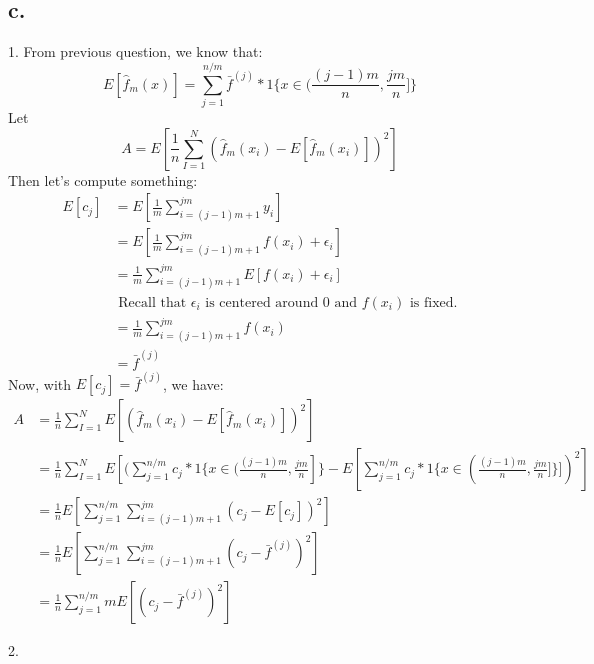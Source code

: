 \documentclass{article}
\begin{document}
\subsection*{c.}

1. \newline
From previous question, we know that:
\[
E[\hat{f}_m(x)] = \sum_{j=1}^{n/m} \bar{f}^{(j)} *1\{x \in (\frac{(j-1)m}{n},\frac{jm}{n}]\}
\]
Let 
\[A = E[\frac{1}{n} \sum_{I=1}^{N}(\hat{f}_m(x_i) - E[\hat{f}_m(x_i)])^2]\]
Then let's compute something:
\begin{subequations}
\begin{align*}
E[c_j] & = E[\frac{1}{m} \sum_{i=(j-1)m+1}^{jm}y_i] \\
& = E[\frac{1}{m} \sum_{i=(j-1)m+1}^{jm} f(x_i) + \epsilon_i] \\
& = \frac{1}{m} \sum_{i=(j-1)m+1}^{jm} E[f(x_i) + \epsilon_i] \\
& \text{ Recall that $\epsilon_i$ is centered around 0 and $f(x_i)$ is fixed.} \\
& = \frac{1}{m} \sum_{i=(j-1)m+1}^{jm} f(x_i) \\
& = \bar{f}^{(j)}
\end{align*}
\end{subequations}
Now, with $E[c_j] = \bar{f}^{(j)}$, we have:
\begin{subequations}
\begin{align*}
A & = \frac{1}{n} \sum_{I=1}^{N} E[ (\hat{f}_m(x_i) - E[\hat{f}_m(x_i)])^2] \\
& = \frac{1}{n} \sum_{I=1}^{N} E[(\sum_{j=1}^{n/m}  c_j*1\{x \in (\frac{(j-1)m}{n},\frac{jm}{n}]\} - E[\sum_{j=1}^{n/m} c_j *1\{x \in (\frac{(j-1)m}{n},\frac{jm}{n}]\}])^2] \\
& = \frac{1}{n} E[\sum_{j=1}^{n/m} \sum_{i=(j-1)m+1}^{jm} (c_j - E[c_j])^2  ] \\
& = \frac{1}{n} E[\sum_{j=1}^{n/m} \sum_{i=(j-1)m+1}^{jm} (c_j -  \bar{f}^{(j)})^2  ] \\
& = \frac{1}{n} \sum_{j=1}^{n/m} mE[(c_j -  \bar{f}^{(j)})^2]
\end{align*}
\end{subequations}

2. \newline
\end{document}
